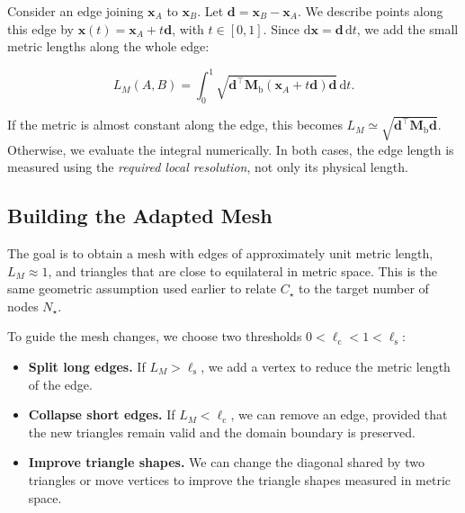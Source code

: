 \documentclass[11pt,a4paper]{article}
\begin{document}
\noindent Consider an edge joining $\mathbf x_A$ to
$\mathbf x_B$. Let $\mathbf d=\mathbf x_B-\mathbf x_A$.
We describe points along this edge by
$\mathbf x(t)=\mathbf x_A+t\mathbf d$, with $t\in[0,1]$.
Since $\mathrm d\mathbf x=\mathbf d\,\mathrm dt$,
we add the small metric lengths along the whole edge:

\begin{equation}
    \label{eq:edge_metric_length}
    \boxed{
    L_M(A,B)=\int_0^1
    \sqrt{\mathbf d^\top
    \mathbf M_{\mathrm b}(\mathbf x_A+t\mathbf d)
    \mathbf d}\,\mathrm dt.
    }
\end{equation}

\noindent If the metric is almost constant along the edge,
this becomes $L_M\simeq\sqrt{\mathbf d^\top
\mathbf M_{\mathrm b}\mathbf d}$. Otherwise, we evaluate
the integral numerically. In both cases, the edge length
is measured using the \emph{required local resolution},
not only its physical length.

\subsection{Building the Adapted Mesh}

\noindent The goal is to obtain a mesh with edges of
approximately unit metric length, $L_M\approx1$, and
triangles that are close to equilateral in metric space.
This is the same geometric assumption used earlier to
relate $C_\star$ to the target number of nodes $N_\star$.

\noindent To guide the mesh changes, we choose two thresholds
$0<\ell_{\mathrm c}<1<\ell_{\mathrm s}$:

\begin{itemize}
    \item \textbf{Split long edges.} If
    $L_M>\ell_{\mathrm s}$, we add a vertex to reduce
    the metric length of the edge.

    \item \textbf{Collapse short edges.} If
    $L_M<\ell_{\mathrm c}$, we can remove an edge,
    provided that the new triangles remain valid and
    the domain boundary is preserved.

    \item \textbf{Improve triangle shapes.} We can
    change the diagonal shared by two triangles or
    move vertices to improve the triangle shapes
    measured in metric space.
\end{itemize}
\end{document}
